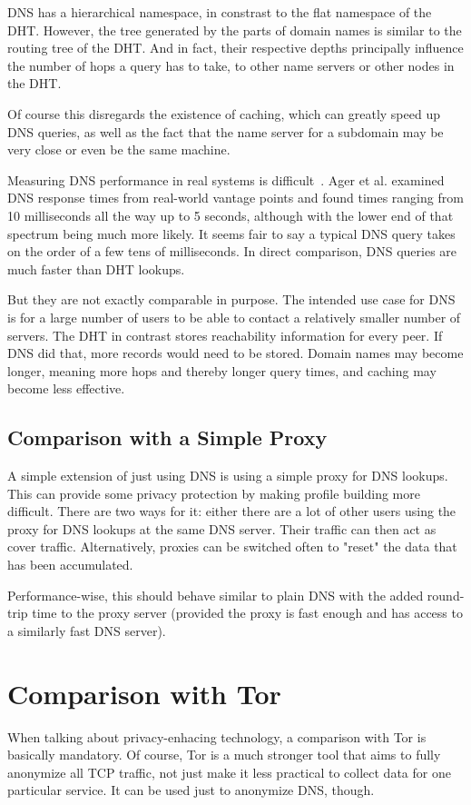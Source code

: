 DNS has a hierarchical namespace, in constrast to the flat namespace of the DHT.
However, the tree generated by the parts of domain names is similar to the
routing tree of the DHT. And in fact, their respective depths principally
influence the number of hops a query has to take, to other name servers or other
nodes in the DHT.

Of course this disregards the existence of caching, which can greatly speed up
DNS queries, as well as the fact that the name server for a subdomain may be
very close or even be the same machine.

Measuring DNS performance in real systems is
difficult~\cite{liston2002diversity}. Ager et al.\cite{ager2010comparing}
examined DNS response times from real-world vantage points and found times
ranging from 10 milliseconds all the way up to 5 seconds, although with the
lower end of that spectrum being much more likely. It seems fair to say a
typical DNS query takes on the order of a few tens of milliseconds. In direct
comparison, DNS queries are much faster than DHT lookups.

But they are not exactly comparable in purpose. The intended use case for DNS is
for a large number of users to be able to contact a relatively smaller number of
servers. The DHT in contrast stores reachability information for every peer. If
DNS did that, more records would need to be stored. Domain names may become
longer, meaning more hops and thereby longer query times, and caching may become
less effective.

\subsection{Comparison with a Simple Proxy}
A simple extension of just using DNS is using a simple proxy for DNS lookups.
This can provide some privacy protection by making profile building more
difficult. There are two ways for it: either there are a lot of other users
using the proxy for DNS lookups at the same DNS server. Their traffic can then
act as cover traffic. Alternatively, proxies can be switched often to "reset"
the data that has been accumulated.

Performance-wise, this should behave similar to plain DNS with the added
round-trip time to the proxy server (provided the proxy is fast enough and has
access to a similarly fast DNS server).

\section{Comparison with Tor}
When talking about privacy-enhacing technology, a comparison with Tor is
basically mandatory. Of course, Tor is a much stronger tool that aims to fully
anonymize all TCP traffic, not just make it less practical to collect data for
one particular service. It can be used just to anonymize DNS, though.

